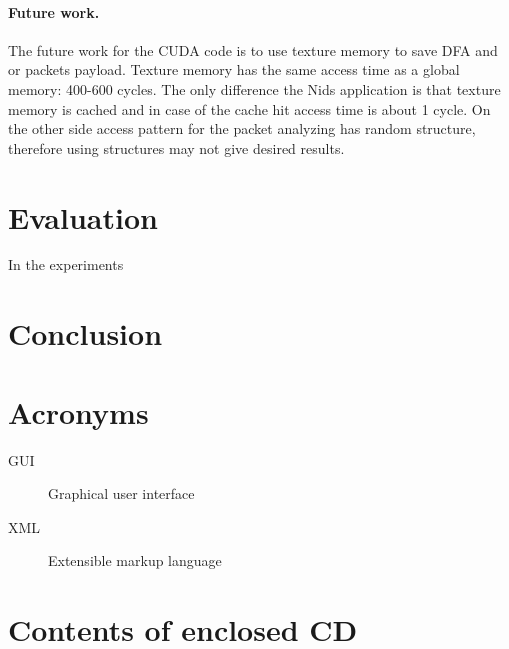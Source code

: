 \documentclass[thesis=M,english]{FITthesis}[2011/07/15]
\begin{document}
\subsubsection*{Future work.}
The future work for the CUDA code is to use texture memory to save DFA and\\or packets payload. Texture memory has the same access time as a global memory: 400-600 cycles. The only difference the Nids application is that texture memory is cached and in case of the cache hit access time is about 1 cycle. On the other side access pattern for the packet analyzing has random structure, therefore using structures may not give desired results.

\chapter{Evaluation}
In the experiments 

\chapter{Conclusion}





\appendix

\chapter{Acronyms}
\begin{description}
	\item[GUI] Graphical user interface
	\item[XML] Extensible markup language
\end{description}


\chapter{Contents of enclosed CD}
\end{document}
